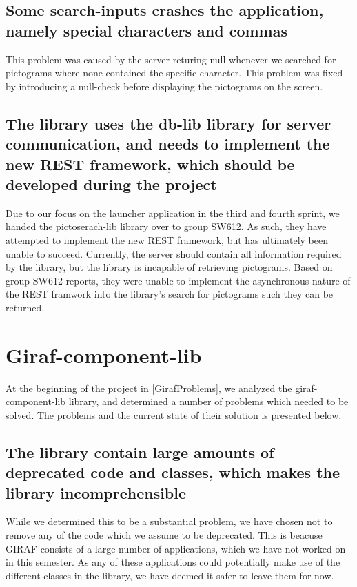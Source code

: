\subsection*{Some search-inputs crashes the application, namely special
characters and commas}
This problem was caused by the server returing null whenever we searched for
pictograms where none contained the specific character. This problem was fixed
by introducing a null-check before displaying the pictograms on the screen.
  
  
\subsection*{The library uses the db-lib library for server communication, and
needs to implement the new REST framework, which should be developed during the
project}
Due to our focus on the launcher application in the third and fourth sprint, we
handed the pictoserach-lib library over to group SW612. As such, they have
attempted to implement the new REST framework, but has ultimately been unable to
succeed. Currently, the server should contain all information required by the
library, but the library is incapable of retrieving pictograms. Based on group
SW612 reports, they were unable to implement the asynchronous nature of the REST
framwork into the library's search for pictograms such they can be returned.

\section{Giraf-component-lib}
At the beginning of the project in \autoref{GirafProblems}, we analyzed the
giraf-component-lib library, and determined a number of problems which needed to
be solved. The problems and the current state of their solution is presented
below.

\subsection*{The library contain large amounts of deprecated code and classes,
which makes the library incomprehensible}
While we determined this to be a substantial problem, we have chosen not to
remove any of the code which we assume to be deprecated. This is beacuse GIRAF
consists of a large number of applications, which we have not worked on in this
semester. As any of these applications could potentially make use of the
different classes in the library, we have deemed it safer to leave them for now.

